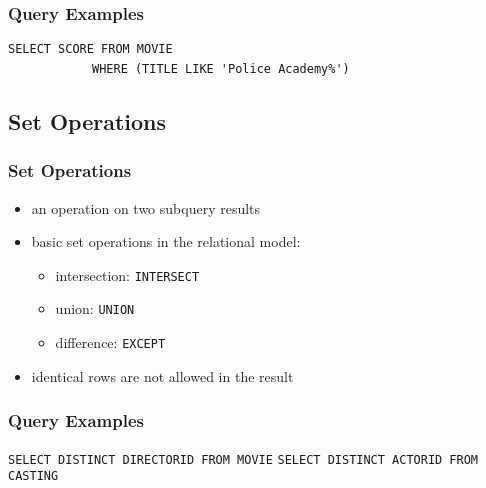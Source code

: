 \documentclass[dvipsnames]{beamer}
\theoremstyle{plain}
\begin{document}
\begin{frame}[fragile]
  \frametitle{Query Examples}

  \begin{example}
\lstinline!SELECT SCORE FROM MOVIE!\\
~~~~~~~~~~~~\lstinline!WHERE (TITLE LIKE 'Police Academy%')!
  \end{example}
\end{frame}

\subsection{Set Operations}

\begin{frame}
  \frametitle{Set Operations}

  \begin{itemize}
    \item an operation on two subquery results

    \item basic set operations in the relational model:
    \begin{itemize}
      \item intersection: \lstinline!INTERSECT!
      \item union: \lstinline!UNION!
      \item difference: \lstinline!EXCEPT!
    \end{itemize}

    \pause
    \item identical rows are not allowed in the result
  \end{itemize}
\end{frame}

\begin{frame}[fragile]
  \frametitle{Query Examples}

  \begin{example}
\lstinline!SELECT DISTINCT DIRECTORID FROM MOVIE!
\lstinline!SELECT DISTINCT ACTORID FROM CASTING!
  \end{example}
\end{frame}
\end{document}
